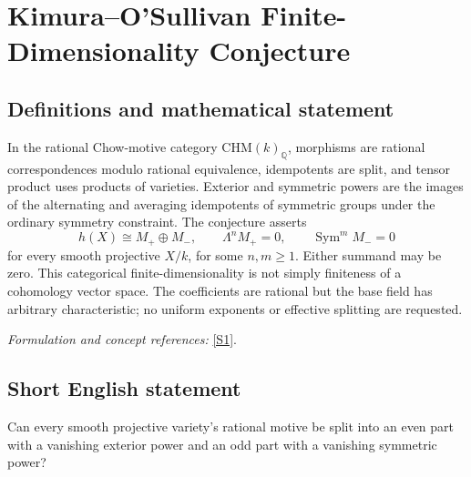 \documentclass[11pt,a4paper]{article}
\newcommand{\Q}{\mathbb{Q}}
\newcommand{\sref}[2]{\hyperlink{source:#1:#2}{[S#2]}}
\newif\ifshowcatalogue
\newcommand{\cataloguescope}[1]{\ifshowcatalogue
 \paragraph{Exact scope in the supplied catalogue.}
 \begin{quote}\small #1\end{quote}\fi}
\numberwithin{equation}{section}
\begin{document}
\setcounter{section}{190}
\clearpage
\section{\texorpdfstring{Kimura–O'Sullivan Finite-Dimensionality Conjecture}{Kimura–O'Sullivan Finite-Dimensionality Conjecture}}\label{191}
\subsection{Definitions and mathematical statement}
In the rational Chow-motive category $\mathrm{CHM}(k)_{\Q}$, morphisms are rational correspondences modulo rational equivalence, idempotents are split, and tensor product uses products of varieties. Exterior and symmetric powers are the images of the alternating and averaging idempotents of symmetric groups under the ordinary symmetry constraint. The conjecture asserts
\[
 h(X)\cong M_+\oplus M_-,\qquad
 \Lambda^n M_+=0,\qquad\operatorname{Sym}^m M_-=0
\]
for every smooth projective $X/k$, for some $n,m\ge1$. Either summand may be zero. This categorical finite-dimensionality is not simply finiteness of a cohomology vector space. The coefficients are rational but the base field has arbitrary characteristic; no uniform exponents or effective splitting are requested.
\par\smallskip\textit{Formulation and concept references:} \sref{191}{1}.
\cataloguescope{For every field k and every smooth projective variety X over k, the Chow motive h(X) with rational coefficients in the ordinary symmetric, pseudo-abelian category CHM(k)\_Q is Kimura–O'Sullivan finite-dimensional: there exist motives M+ and M\ensuremath{-} and positive integers n,m such that h(X) is isomorphic to M+ direct-sum M\ensuremath{-}, the exterior power \ensuremath{\Lambda}\textasciicircum{}n(M+) is zero, and the symmetric power Sym\textasciicircum{}m(M\ensuremath{-}) is zero. The summands may be zero. The field k is unrestricted; characteristic zero applies to the rational coefficient field, not to k. No effective construction, uniform n,m or classification is required.}
\subsection{Short English statement}
Can every smooth projective variety's rational motive be split into an even part with a vanishing exterior power and an odd part with a vanishing symmetric power?
\end{document}
